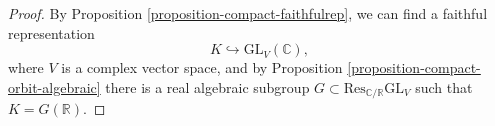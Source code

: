 \begin{remarks}
\begin{proof}
 By Proposition \ref{proposition-compact-faithfulrep}, we can find a faithful representation
 $$ K\hookrightarrow \text{GL}_V (\mathbb C),$$
 where $V$ is a complex vector space, and by Proposition \ref{proposition-compact-orbit-algebraic} 
 there is a real algebraic subgroup $G\subset \text{Res}_{\mathbb C/\mathbb R} \text{GL}_V$ such that $K=G(\mathbb R)$.
\end{proof}



 \end{remarks}
















